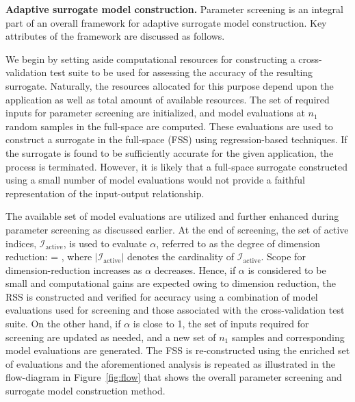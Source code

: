 \textbf{Adaptive surrogate model construction.}
Parameter screening is an integral part of an overall framework for adaptive
surrogate model construction. Key attributes of the framework are discussed 
as follows. 

We begin by setting aside computational resources for constructing a cross-validation
test suite to be used for assessing the accuracy of the resulting surrogate.
Naturally, the resources allocated for this purpose depend upon the application
as well as total amount of available resources. 
The set of required inputs for parameter screening are initialized,
and model evaluations at $n_1$ random samples in the full-space are computed.
These evaluations are used to construct a surrogate in the full-space (FSS)
using regression-based techniques. If the surrogate is found to be sufficiently
accurate for the given application, the process is terminated. However, it is
likely that a full-space surrogate constructed using a 
small number of model evaluations would not provide a 
faithful representation of the input-output relationship.  

The available set of model evaluations are utilized and further enhanced during
parameter screening as discussed earlier.  At the end of screening, the set of
active indices, $\mathcal{I}_\text{active}$, is used to evaluate $\alpha$, referred
to as the degree of dimension reduction:
%
\be
\alpha = ,
\label{eq:alpha}
\ee
%
where $|\mathcal{I}_\text{active}|$ denotes the cardinality of
$\mathcal{I}_\text{active}$.  Scope for dimension-reduction increases as
$\alpha$ decreases.  Hence, if $\alpha$ is considered to be small and
computational gains are expected owing to dimension reduction, the RSS is
constructed and verified for accuracy using a combination of model evaluations
used for screening and those associated with the cross-validation test suite.  On the
other hand, if $\alpha$ is close to 1, the set of inputs required for screening are
 updated as needed, and a
new set of $n_1$ samples and corresponding model evaluations are generated. The
FSS is re-constructed using the enriched set of evaluations and the
aforementioned analysis is repeated as illustrated in the flow-diagram
in Figure~\ref{fig:flow} that shows the overall 
parameter screening and surrogate model construction method.

